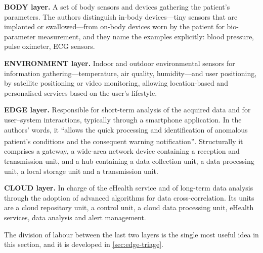 \documentclass[12pt,a4paper,oneside]{report}
\newcommand{\bq}[1]{``#1''\textsuperscript{\dag}}
\begin{document}
\textbf{BODY layer.} A set of body sensors and devices gathering the patient's parameters. The authors distinguish in-body devices---tiny sensors that are implanted or swallowed---from on-body devices worn by the patient for bio-parameter measurement, and they name the examples explicitly: blood pressure, pulse oximeter, ECG sensors.

\textbf{ENVIRONMENT layer.} Indoor and outdoor environmental sensors for information gathering---temperature, air quality, humidity---and user positioning, by satellite positioning or video monitoring, allowing location-based and personalised services based on the user's lifestyle.

\textbf{EDGE layer.} Responsible for short-term analysis of the acquired data and for user--system interactions, typically through a smartphone application. In the authors' words, it \bq{allows the quick processing and identification of anomalous patient's conditions and the consequent warning notification}. Structurally it comprises a gateway, a wide-area network device containing a reception and transmission unit, and a hub containing a data collection unit, a data processing unit, a local storage unit and a transmission unit.

\textbf{CLOUD layer.} In charge of the eHealth service and of long-term data analysis through the adoption of advanced algorithms for data cross-correlation. Its units are a cloud repository unit, a control unit, a cloud data processing unit, eHealth services, data analysis and alert management.

The division of labour between the last two layers is the single most useful idea in this section, and it is developed in \cref{sec:edge-triage}.
\end{document}
